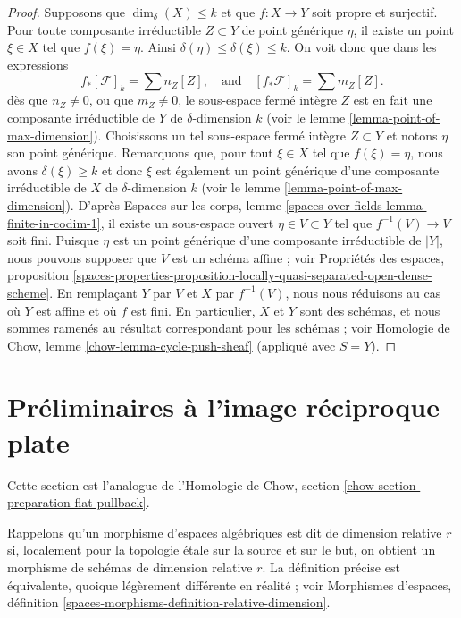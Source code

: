 \begin{proof}
\medskip\noindent
Supposons que $\dim_\delta(X) \leq k$ et que $f : X \to Y$ soit propre et
surjectif. Pour toute composante irréductible $Z \subset Y$ de point
générique $\eta$, il existe un point $\xi \in X$ tel que $f(\xi) = \eta$. Ainsi
$\delta(\eta) \leq \delta(\xi) \leq k$. On voit donc que dans les expressions
$$
f_*[\mathcal{F}]_k = \sum n_Z[Z],
\quad
\text{and}
\quad
[f_*\mathcal{F}]_k = \sum m_Z[Z].
$$
dès que $n_Z \not = 0$, ou que $m_Z \not = 0$, le sous-espace fermé
intègre $Z$ est en fait une composante irréductible de $Y$ de
$\delta$-dimension $k$ (voir le lemme \ref{lemma-point-of-max-dimension}).
Choisissons un tel sous-espace fermé intègre $Z \subset Y$ et notons $\eta$ son
point générique. Remarquons que, pour tout $\xi \in X$ tel que $f(\xi) = \eta$,
nous avons
$\delta(\xi) \geq k$ et donc $\xi$ est également un point générique d'une
composante irréductible de $X$ de $\delta$-dimension $k$ (voir le lemme
\ref{lemma-point-of-max-dimension}). D'après Espaces sur les corps, lemme
\ref{spaces-over-fields-lemma-finite-in-codim-1}, il existe un sous-espace
ouvert $\eta \in V \subset Y$ tel que $f^{-1}(V) \to V$ soit fini. Puisque
$\eta$ est un point générique d'une composante irréductible de $|Y|$, nous
pouvons supposer que $V$ est un schéma affine ; voir Propriétés des espaces,
proposition
\ref{spaces-properties-proposition-locally-quasi-separated-open-dense-scheme}.
En remplaçant $Y$ par $V$ et $X$ par $f^{-1}(V)$, nous nous réduisons au cas où
$Y$ est affine et où $f$ est fini. En particulier, $X$ et $Y$ sont des schémas,
et nous sommes ramenés au résultat correspondant pour les schémas ; voir
Homologie de Chow, lemme \ref{chow-lemma-cycle-push-sheaf} (appliqué avec $S = Y$).
\end{proof}













\section{Préliminaires à l'image réciproque plate}
\label{section-preparation-flat-pullback}

\noindent
Cette section est l'analogue de l'Homologie de Chow, section
\ref{chow-section-preparation-flat-pullback}.

\medskip\noindent
Rappelons qu'un morphisme d'espaces algébriques est dit de dimension relative
$r$ si, localement pour la topologie \'etale sur la source et sur le but, on
obtient un morphisme de schémas de dimension relative $r$. La définition
précise est équivalente, quoique légèrement différente en réalité ; voir
Morphismes d'espaces, définition
\ref{spaces-morphisms-definition-relative-dimension}.


